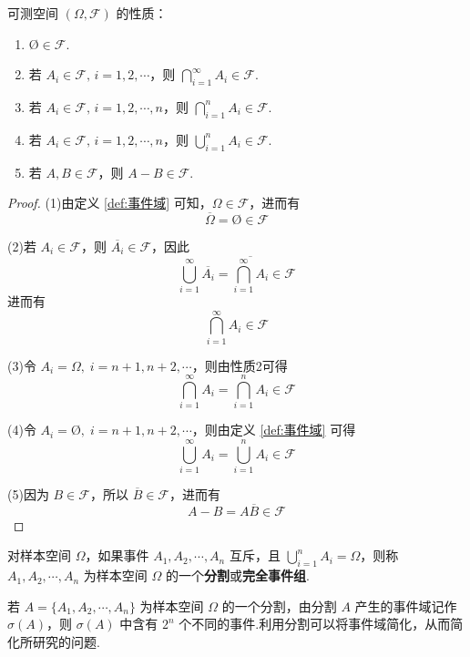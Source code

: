 \begin{property}
    \indent 可测空间 $(\varOmega, \mathcal{F})$ 的性质：
    \begin{enumerate}
        \item $\text{\O} \in \mathcal{F}$.
        \item 若 $A_i \in \mathcal{F}, \, i=1,2,\cdots$，则 $\displaystyle\bigcap_{i=1}^{\infty} A_i \in \mathcal{F}$.
        \item 若 $A_i \in \mathcal{F}, \, i=1,2,\cdots,n$，则 $\displaystyle\bigcap_{i=1}^n A_i \in \mathcal{F}$.
        \item 若 $A_i \in \mathcal{F}, \, i=1,2,\cdots,n$，则 $\displaystyle\bigcup_{i=1}^n A_i \in \mathcal{F}$.
        \item 若 $A,B \in \mathcal{F}$，则 $A-B \in \mathcal{F}$.
    \end{enumerate}
\end{property}

\begin{proof}
    (1)由定义 \ref{def:事件域} 可知，$\varOmega \in \mathcal{F}$，进而有
    $$
    \overline{\varOmega} = \text{\O} \in \mathcal{F}
    $$

    (2)若 $A_i \in \mathcal{F}$，则 $\overline{A_i} \in \mathcal{F}$，因此
    $$
    \bigcup_{i=1}^{\infty} \overline{A_i} = \overline{\bigcap_{i=1}^{\infty} A_i} \in \mathcal{F}
    $$
    进而有
    $$
    \bigcap_{i=1}^{\infty} A_i \in \mathcal{F}
    $$

    (3)令 $A_{i} = \varOmega,\; i = n+1, n+2, \cdots$，则由性质2可得
    $$
    \bigcap_{i=1}^{\infty} A_i = \bigcap_{i=1}^{n} A_i \in \mathcal{F}
    $$

    (4)令 $A_{i} = \text{\O},\; i = n+1, n+2, \cdots$，则由定义 \ref{def:事件域} 可得
    $$
    \bigcup_{i=1}^{\infty} A_i = \bigcup_{i=1}^{n} A_i \in \mathcal{F}
    $$

    (5)因为 $B \in \mathcal{F}$，所以 $\overline{B} \in \mathcal{F}$，进而有
    $$
    A-B = A \overline{B} \in \mathcal{F}
    $$
\end{proof}

\begin{definition}
    \indent 对样本空间 $\varOmega$，如果事件 $A_1,A_2,\cdots,A_n$ 互斥，且 $\displaystyle\bigcup_{i=1}^n A_i=\varOmega$，则称 $A_1,A_2,\cdots,A_n$ 为样本空间 $\varOmega$ 的一个\textbf{分割}或\textbf{完全事件组}.
\end{definition}

若 $A = \{ A_1,A_2,\cdots,A_n \}$ 为样本空间 $\varOmega$ 的一个分割，由分割 $A$ 产生的事件域记作 $\sigma(A)$，则 $\sigma(A)$ 中含有 $2^n$ 个不同的事件.利用分割可以将事件域简化，从而简化所研究的问题.

